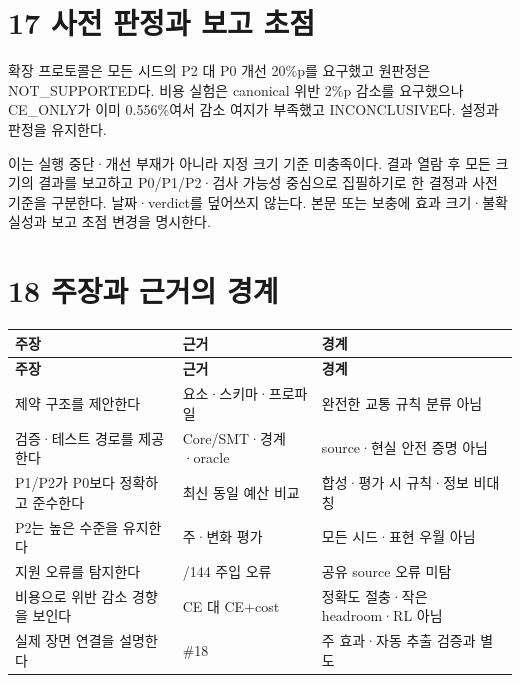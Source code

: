 \documentclass[11pt,a4paper]{article}
\begin{document}
\clearpage{}\section*{17 사전 판정과 보고 초점}

확장 프로토콜은 모든 시드의 P2 대 P0 개선 20\%p를 요구했고 원판정은 NOT\_\allowbreak{}SUPPORTED다. 비용 실험은 canonical 위반 2\%p 감소를 요구했으나 CE\_\allowbreak{}ONLY가 이미 0.556\%여서 감소 여지가 부족했고 INCONCLUSIVE다. 설정과 판정을 유지한다.\par

이는 실행 중단·개선 부재가 아니라 지정 크기 기준 미충족이다. 결과 열람 후 모든 크기의 결과를 보고하고 P0/P1/P2·검사 가능성 중심으로 집필하기로 한 결정과 사전 기준을 구분한다. 날짜·verdict를 덮어쓰지 않는다. 본문 또는 보충에 효과 크기·불확실성과 보고 초점 변경을 명시한다.\par

\clearpage{}\section*{18 주장과 근거의 경계}

\begingroup\small
\begin{longtable}{@{}>{\raggedright\arraybackslash}p{}>{\raggedright\arraybackslash}p{}>{\raggedright\arraybackslash}p{}@{}}
\toprule
\textbf{주장} & \textbf{근거} & \textbf{경계} \\
\midrule\endfirsthead
\toprule
\textbf{주장} & \textbf{근거} & \textbf{경계} \\
\midrule\endhead
\bottomrule\endfoot
제약 구조를 제안한다 & 요소·스키마·프로파일 & 완전한 교통 규칙 분류 아님 \\
검증·테스트 경로를 제공한다 & Core/SMT·경계·oracle & source·현실 안전 증명 아님 \\
P1/P2가 P0보다 정확하고 준수한다 & 최신 동일 예산 비교 & 합성·평가 시 규칙·정보 비대칭 \\
P2는 높은 수준을 유지한다 & 주·변화 평가 & 모든 시드·표현 우월 아님 \\
지원 오류를 탐지한다 & 144/144 주입 오류 & 공유 source 오류 미탐 \\
비용으로 위반 감소 경향을 보인다 & CE 대 CE+cost & 정확도 절충·작은 headroom·RL 아님 \\
실제 장면 연결을 설명한다 & \#18 & 주 효과·자동 추출 검증과 별도 \\
\end{longtable}
\endgroup
\end{document}
